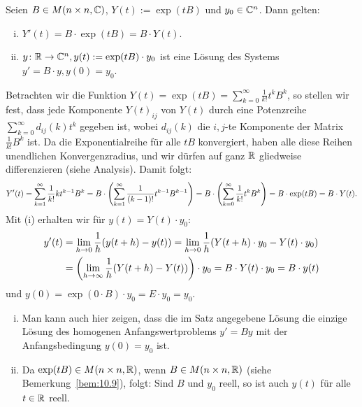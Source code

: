 \begin{satz}
	\label{satz:10.13}
	Seien $B \in M(n \times n,\mathbb{C})$, $Y(t) := \exp(tB)$ und $y_0 \in \mathbb{C}^{n}$.
	Dann gelten:
	\begin{enumerate}[(i)]
		\item $Y'(t) = B \cdot \exp(tB) = B \cdot Y(t)$.
		\item $y\colon \mathbb{R} \rightarrow \mathbb{C}^{n}, y(t) := \exp(tB) \cdot y_0$ ist eine Lösung des Systems $y' = B \cdot y, y(0) = y_0$.
	\end{enumerate}
\end{satz}

\begin{beweis}
	Betrachten wir die Funktion $Y(t) = \exp(tB) = \sum_{k=0}^{\infty} \frac{1}{k!} t^{k} B^{k}$, so stellen wir fest, dass jede Komponente $Y(t)_{ij}$ von $Y(t)$ durch eine Potenzreihe $\sum_{k=0}^{\infty} d_{ij}(k)t^{k}$ gegeben ist, wobei $d_{ij}(k)$ die $i,j$-te Komponente der Matrix $\frac{1}{k!} B^{k}$ ist.
	Da die Exponentialreihe für alle $tB$ konvergiert, haben alle diese Reihen unendlichen Konvergenzradius, und wir dürfen auf ganz $\mathbb{R}$ gliedweise differenzieren (siehe Analysis).
	Damit folgt:	
	\[
		Y'(t) = \sum_{k=1}^{\infty} \frac{1}{k!} kt^{k-1} B^{k} = B \cdot \left(\sum_{k=1}^{\infty} \frac{1}{(k-1)!} t^{k-1} B^{k-1}\right) = B \cdot \left(\sum_{k=0}^{\infty} \frac{1}{k!} t^{k} B^{k}\right) = B \cdot \exp(tB) = B \cdot Y(t).
	\]
	Mit (i) erhalten wir für $y(t) = Y(t) \cdot y_0$:
	\begin{align*}
		y'(t) &= \lim\limits_{h \rightarrow 0} \frac{1}{h} (y(t+h)-y(t)) = \lim\limits_{h \rightarrow 0} \frac{1}{h} (Y(t+h) \cdot y_0 - Y(t) \cdot y_0) \\
		&= \left(\lim\limits_{h \rightarrow \infty} \frac{1}{h}(Y(t+h)-Y(t))\right) \cdot y_0 = B \cdot Y(t) \cdot y_0 = B \cdot y(t)
	\end{align*}
	und $y(0) = \exp(0\cdot B) \cdot y_0 = E \cdot y_0 = y_0$. 
\end{beweis}

\begin{bemerkung}
	\label{bem:10.14}
	\begin{enumerate}[(i)]
		\item Man kann auch hier zeigen, dass die im Satz angegebene Lösung die einzige Lösung des homogenen Anfangswertproblems $y' = By$ mit der Anfangsbedingung $y(0) = y_0$ ist.
		\item Da $\exp(tB) \in M(n \times n,\mathbb{R})$, wenn $B \in M(n \times n,\mathbb{R})$ (siehe Bemerkung~\ref{bem:10.9}), folgt:
		Sind $B$ und $y_0$ reell, so ist auch $y(t)$ für alle $t \in \mathbb{R}$ reell.
	\end{enumerate}
\end{bemerkung}

